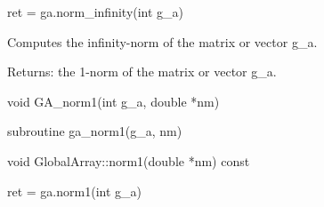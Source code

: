 \documentclass[12pt]{article}
\begin{document}
\begin{pyapi}
\begin{pycode}
ret = ga.norm_infinity(int g_a)
\end{pycode}
\begin{funcargs}
\end{funcargs}
\end{pyapi}

\gcoll

\begin{desc}
Computes the infinity-norm of the matrix or vector g_a.

Returns: the 1-norm of the matrix or vector g_a.
\end{desc}


\begin{capi}
\begin{ccode}
void GA_norm1(int g_a, double *nm)
\end{ccode}
\begin{funcargs}
\end{funcargs}
\end{capi}

\begin{fapi}
\begin{fcode}
subroutine ga_norm1(g_a, nm)
\end{fcode}
\begin{funcargs}
\end{funcargs}
\end{fapi}

\begin{cxxapi}
\begin{cxxcode}
void GlobalArray::norm1(double *nm) const
\end{cxxcode}
\begin{funcargs}
\end{funcargs}
\end{cxxapi}

\begin{pyapi}
\begin{pycode}
ret = ga.norm1(int g_a)
\end{pycode}
\begin{funcargs}
\end{funcargs}
\end{pyapi}
\end{document}
